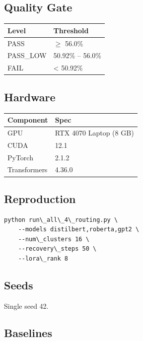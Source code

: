 \subsection{Quality Gate}

\begin{table}[H]
\centering
\small
\begin{tabular}{ll}
\toprule
\textbf{Level} & \textbf{Threshold} \\
\midrule
PASS & $\ge$ 56.0\% \\
PASS\_LOW & 50.92\% -- 56.0\% \\
FAIL & \textless{} 50.92\% \\
\bottomrule
\end{tabular}
\end{table}

\subsection{Hardware}

\begin{table}[H]
\centering
\small
\begin{tabular}{ll}
\toprule
\textbf{Component} & \textbf{Spec} \\
\midrule
GPU & RTX 4070 Laptop (8 GB) \\
CUDA & 12.1 \\
PyTorch & 2.1.2 \\
Transformers & 4.36.0 \\
\bottomrule
\end{tabular}
\end{table}

\subsection{Reproduction}

\begin{lstlisting}
python run\_all\_4\_routing.py \
    --models distilbert,roberta,gpt2 \
    --num\_clusters 16 \
    --recovery\_steps 50 \
    --lora\_rank 8
\end{lstlisting}

\subsection{Seeds}

Single seed 42.

\subsection{Baselines}

